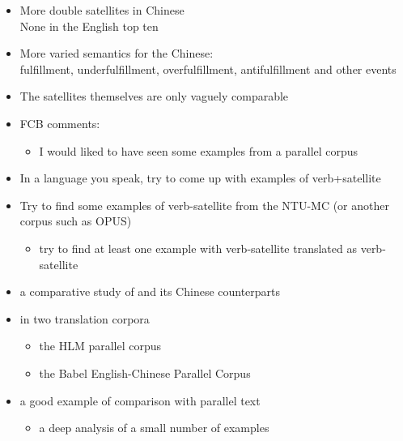 \documentclass[a4paper,landscape,headrule,footrule,dvips]{foils}
\begin{document}
\begin{CJK}{UTF8}{min}
\begin{itemize}
\item More double satellites in Chinese
\\ None in the English top ten
\item More varied semantics for the Chinese:
\\  fulfillment,  underfulfillment, overfulfillment, antifulfillment and other events
\item The satellites themselves are only vaguely comparable 
\bigskip
\item FCB comments:
  \begin{itemize}
  \item I would liked to have seen some examples from a parallel corpus
  \end{itemize}
\end{itemize}

\begin{itemize}
\item In a language you speak, try to come up with examples of verb+satellite
\item Try to find some examples of verb-satellite from the NTU-MC (or
  another corpus such as OPUS)
  \begin{itemize}
  \item try to find at least one example with verb-satellite
    translated as verb-satellite
  \end{itemize}
\end{itemize}



\begin{itemize}
\item a comparative study of  and its Chinese counterparts
\item  in two translation corpora
  \begin{itemize}
  \item the HLM parallel corpus
  \item the Babel English-Chinese Parallel Corpus
  \end{itemize}
\item a good example of comparison with parallel text
  \begin{itemize}
  \item a deep analysis of a small number of examples
  \end{itemize}
\end{itemize}


\end{CJK}
\end{document}
